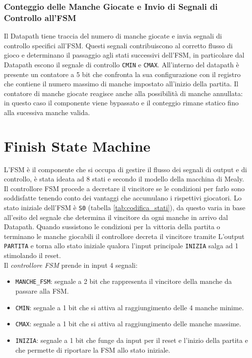 \documentclass[a4paper]{report}
\begin{document}
\subsubsection{Conteggio delle Manche Giocate e Invio di Segnali di Controllo all'FSM}
Il Datapath tiene traccia del numero di manche giocate e invia segnali di controllo specifici all'FSM.
Questi segnali contribuiscono al corretto flusso di gioco e determinano il passaggio agli stati successivi dell'FSM, in particolare dal Datapath escono il segnale di controllo \texttt{CMIN} e \texttt{CMAX}.
All'interno del datapath è presente un contatore a 5 bit che confronta la sua configurazione con il registro che contiene il numero massimo di manche impostato all'inizio della partita.
Il contatore di manche giocate reagisce anche alla possibilità di manche annullata: in questo caso il componente viene bypassato e il conteggio rimane statico fino alla sucessiva manche valida.

\section{Finish State Machine}

L'FSM è il componente che si occupa di gestire il flusso dei segnali di output e di controllo, è stata ideata ad 8 stati e secondo il modello della macchina di Mealy.
Il controllore FSM procede a decretare il vincitore se le condizioni per farlo sono soddisfatte tenendo conto dei vantaggi che accumulano i rispettivi giocatori.
Lo stato iniziale dell'FSM è \texttt{S0} (tabella \ref{tab:codifica_stati}), da questo varia in base all'esito del segnale che determina il vincitore da ogni manche in arrivo dal Datapath.
Quando sussistono le condizioni per la vittoria della partita o terminano le manche giocabili il controllore decreta il vincitore tramite L'output \texttt{PARTITA} e torna allo stato iniziale qualora l'input principale \texttt{INIZIA} salga ad 1 stimolando il reset.
\\
Il \textit{controllore FSM} prende in input 4 segnali:
\begin{itemize}
    \item \texttt{MANCHE\_FSM}: segnale a 2 bit che rappresenta il vincitore della manche da passare alla FSM.
    \item \texttt{CMIN}: segnale a 1 bit che si attiva al raggiungimento delle 4 manche minime.
    \item \texttt{CMAX}: segnale a 1 bit che si attiva al raggiungimento delle manche massime.
    \item \texttt{INIZIA}: segnale a 1 bit che funge da input per il reset e l'inizio della partita e che permette di riportare la FSM allo stato iniziale.
\end{itemize}
\end{document}
